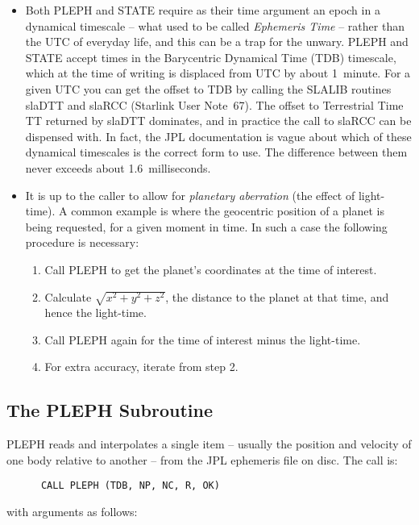 \documentclass[twoside,11pt]{article}
\newcommand{\xref}[3]{#1}
\newcommand{\xlabel}[1]{}
\renewcommand{\_}{\texttt{\symbol{95}}}
\begin{document}
\begin{itemize}

\item Both PLEPH and STATE require as their time argument an epoch in a
dynamical timescale -- what used to be called \textit{Ephemeris Time}\/
-- rather than the UTC of everyday life, and this can be a trap for
the unwary.  PLEPH and STATE accept times in the Barycentric Dynamical
Time (TDB) timescale, which at the time of writing is displaced from
UTC by about 1~minute.  For a given UTC you can get the offset to TDB
by calling the SLALIB routines
\xref{sla\_DTT}{sun67}{SLA_DTT} and
\xref{sla\_RCC}{sun67}{SLA_RCC}
(\xref{Starlink User Note~67}{sun67}{}).
The offset to Terrestrial Time TT returned by
\xref{sla\_DTT}{sun67}{SLA_DTT}
dominates, and in practice the call to
\xref{sla\_RCC}{sun67}{SLA_RCC}
can be dispensed with.  In fact, the JPL documentation is vague
about which of these dynamical timescales is the correct form to use.
The difference between them never exceeds about 1.6~milliseconds.

\item It is up to the caller to allow for \textit{planetary aberration}\/
(the effect of light-time).  A common example is where the geocentric
position of a planet is being requested, for a given moment in time.
In such a case the following procedure is necessary:

\begin{enumerate}
\item Call PLEPH to get the planet's coordinates
at the time of interest.
\item Calculate $\sqrt{x^{2}+y^{2}+z^{2}}$,
the distance to the planet at that time,
and hence the light-time.
\item Call PLEPH again for the time of interest minus the
light-time.
\item For extra accuracy, iterate from step 2.
\end{enumerate}
\end{itemize}

\subsection{\xlabel{the_pleph_subroutine}The PLEPH Subroutine}
\label{the_pleph_subroutine}

PLEPH reads and interpolates a single item --
usually the position and velocity
of one body relative to another --
from the JPL ephemeris file on disc.
The call is:
\begin{verbatim}
      CALL PLEPH (TDB, NP, NC, R, OK)
\end{verbatim}
with arguments as follows:
\end{document}
